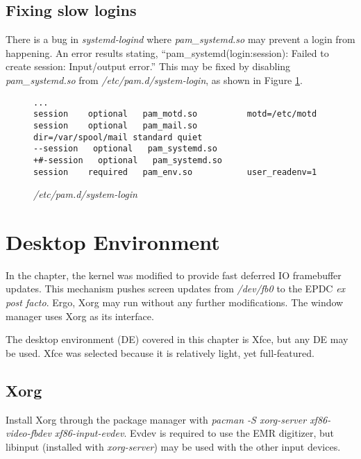 \documentclass{memoir}
\begin{document}
\section{Fixing slow logins}
There is a bug in \textit{systemd-logind} where \textit{pam\_systemd.so} may prevent a login from happening. An error results stating, ``pam\_systemd(login:session): Failed to create session: Input/output error.'' This may be fixed by disabling \textit{pam\_systemd.so} from \textit{/etc/pam.d/system-login}, as shown in Figure \ref{fig:pamsystemlogin}.


\begin{figure}[h]
\begin{verbatim}
...
session    optional   pam_motd.so          motd=/etc/motd
session    optional   pam_mail.so          dir=/var/spool/mail standard quiet
--session   optional   pam_systemd.so
+#-session   optional   pam_systemd.so
session    required   pam_env.so           user_readenv=1
\end{verbatim}
\caption{\textit{/etc/pam.d/system-login}}
\label{fig:pamsystemlogin}
\end{figure}






    
\chapter{Desktop Environment}
In the  chapter, the kernel was modified to provide fast deferred IO framebuffer updates. This mechanism pushes screen updates from \textit{/dev/fb0} to the EPDC \textit{ex post facto}. Ergo, Xorg may run without any further modifications. The window manager uses Xorg as its interface.

The desktop environment (DE) covered in this chapter is Xfce, but any DE may be used. Xfce was selected because it is relatively light, yet full-featured.

\section{Xorg}
Install Xorg through the package manager with \textit{pacman -S xorg-server xf86-video-fbdev xf86-input-evdev}. Evdev is required to use the EMR digitizer, but libinput (installed with \textit{xorg-server}) may be used with the other input devices.
\end{document}
